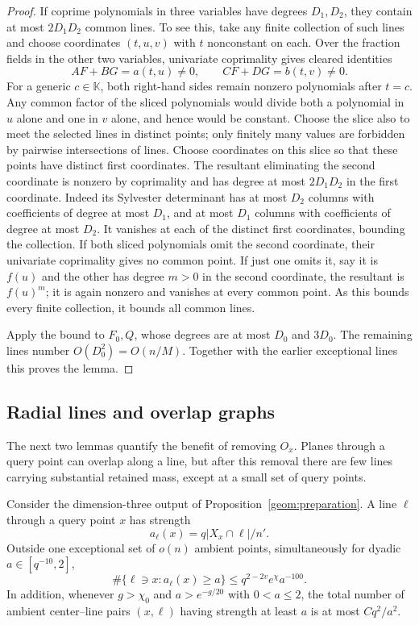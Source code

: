 \begin{proof}
If coprime polynomials in three variables have degrees $D_1,D_2$,
they contain at most $2D_1D_2$ common lines. To see this, take any
finite collection of such lines and choose coordinates $(t,u,v)$
with $t$ nonconstant on each. Over the fraction fields in the other
two variables, univariate coprimality gives cleared identities
\[
 A F+B G=a(t,u)\ne0,\qquad
 C F+D G=b(t,v)\ne0.
\]
For a generic $c\in\mathbb K$, both right-hand sides remain
nonzero polynomials after $t=c$. Any common factor of the sliced
polynomials would divide both a polynomial in $u$ alone and one in
$v$ alone, and hence would be constant. Choose the slice also to
meet the selected lines in distinct points; only finitely many
values are forbidden by pairwise intersections of lines.
Choose coordinates on this slice so that these points have distinct
first coordinates. The resultant eliminating the second coordinate
is nonzero by coprimality and has degree at most $2D_1D_2$ in the
first coordinate. Indeed its Sylvester determinant has at most
$D_2$ columns with coefficients of degree at most $D_1$, and at
most $D_1$ columns with coefficients of degree at most $D_2$.
It vanishes at each of the distinct first coordinates, bounding
the collection. If both sliced polynomials omit the second
coordinate, their univariate coprimality gives no common point.
If just one omits it, say it is $f(u)$ and the other has degree
$m>0$ in the second coordinate, the resultant is $f(u)^m$;
it is again nonzero and vanishes at every common point.
As this bounds every finite collection, it bounds all common lines.

Apply the bound to $F_0,Q$, whose degrees are at most $D_0$ and
$3D_0$. The remaining lines number $O(D_0^2)=O(n/M)$. Together
with the earlier exceptional lines this proves the lemma.
\end{proof}

\subsection{Radial lines and overlap graphs}

The next two lemmas quantify the benefit of removing $O_x$. Planes
through a query point can overlap along a line, but after this removal
there are few lines carrying substantial retained mass, except at a
small set of query points.

\begin{lemma}\label{geom:radial}
Consider the dimension-three output of
Proposition~\ref{geom:preparation}. A line $\ell$ through a query
point $x$ has strength
\[
 a_\ell(x)=q|X_x\cap\ell|/n'.
\]
Outside one exceptional set of $o(n)$ ambient points, simultaneously
for dyadic $a\in[q^{-10},2]$,
\begin{equation}\label{geom:radial-count}
 \#\{\ell\ni x:a_\ell(x)\geq a\}
 \leq q^{2-2v}e^\chi a^{-100}.
\end{equation}
In addition, whenever $g>\chi_0$ and $a>e^{-g/20}$ with
$0<a\leq2$, the total number of ambient center--line pairs
$(x,\ell)$ having strength at least $a$ is at most $Cq^2/a^2$.
\end{lemma}


